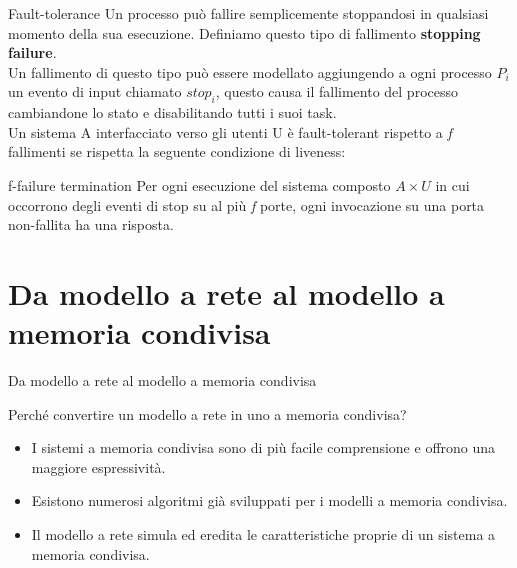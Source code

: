 \documentclass{beamer}
\begin{document}
    \begin{frame}{Fault-tolerance}
        Un processo può fallire semplicemente stoppandosi in qualsiasi momento della sua esecuzione. Definiamo questo tipo di fallimento \textbf{stopping failure}.
        \\[10pt]
        Un fallimento di questo tipo può essere modellato aggiungendo a ogni processo $P_{i}$ un evento di input chiamato \textit{$stop_{i}$}, questo causa il fallimento del processo cambiandone lo stato e disabilitando tutti i suoi task.
        \\[10pt]
        Un sistema A interfacciato verso gli utenti U è fault-tolerant rispetto a \textit{f} fallimenti se rispetta la seguente condizione di liveness:
        \begin{block}{f-failure termination}
            Per ogni esecuzione del sistema composto $A \times U$ in cui occorrono degli eventi di stop su al più \textit{f} porte, ogni invocazione su una porta non-fallita ha una risposta.
        \end{block}

    \end{frame}

    \section{Da modello a rete al modello a memoria condivisa}
    \begin{frame}{Da modello a rete al modello a memoria condivisa}
        \begin{block}{Perché convertire un modello a rete in uno a memoria condivisa?}
            \begin{itemize}
                \item I sistemi a memoria condivisa sono di più facile comprensione e offrono una maggiore espressività.
                \item Esistono numerosi algoritmi già sviluppati per i modelli a memoria condivisa.
                \item Il modello a rete simula ed eredita le caratteristiche proprie di un sistema a memoria condivisa.
            \end{itemize}
        \end{block}
    \end{frame}
\end{document}
